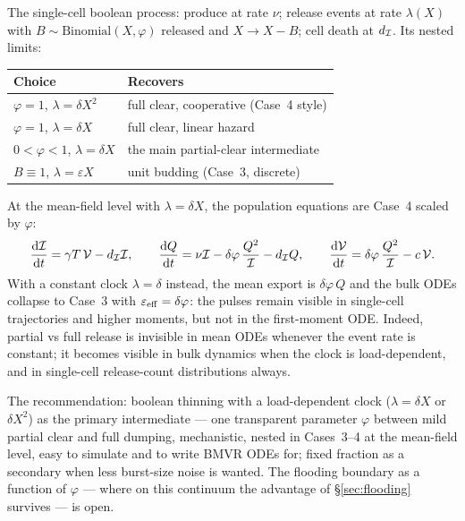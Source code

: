 The single-cell boolean process: produce at rate $\nu$; release events at
rate $\lambda(X)$ with $B\sim\mathrm{Binomial}(X,\varphi)$ released and $X\to
X-B$; cell death at $d_{\mathcal{I}}$. Its nested limits:
\begin{center}
\renewcommand{\arraystretch}{1.2}
\small
\begin{tabular}{@{}ll@{}}
\toprule
Choice & Recovers \\
\midrule
$\varphi=1$, $\lambda=\delta X^2$ & full clear, cooperative (Case~4 style) \\
$\varphi=1$, $\lambda=\delta X$ & full clear, linear hazard \\
$0<\varphi<1$, $\lambda=\delta X$ & the main partial-clear intermediate \\
$B\equiv1$, $\lambda=\varepsilon X$ & unit budding (Case~3, discrete) \\
\bottomrule
\end{tabular}
\end{center}
At the mean-field level with $\lambda=\delta X$, the population equations
are Case~4 scaled by $\varphi$:
\begin{equation}
\displaystyle\frac{{\rm d} \mathcal{I}}{{\rm d} t}=\gamma T\,\mathcal{V}-d_{\mathcal{I}}\mathcal{I},
\qquad
\displaystyle\frac{{\rm d} Q}{{\rm d} t}=\nu\mathcal{I}-\delta\varphi\,\frac{Q^2}{\mathcal{I}}-d_{\mathcal{I}}Q,
\qquad
\displaystyle\frac{{\rm d} \mathcal{V}}{{\rm d} t}=\delta\varphi\,\frac{Q^2}{\mathcal{I}}-c\,\mathcal{V}.
\end{equation}
With a constant clock $\lambda=\delta$ instead, the mean export is
$\delta\varphi\,Q$ and the bulk ODEs collapse to Case~3 with
$\varepsilon_{\rm eff}=\delta\varphi$: the pulses remain visible in single-cell
trajectories and higher moments, but not in the first-moment ODE. Indeed,
partial vs full release is invisible in mean ODEs whenever the event rate
is constant; it becomes visible in bulk dynamics when the clock is
load-dependent, and in single-cell release-count distributions always.

The recommendation: boolean thinning with a load-dependent clock
($\lambda=\delta X$ or $\delta X^2$) as the primary intermediate --- one
transparent parameter $\varphi$ between mild partial clear and full dumping,
mechanistic, nested in Cases~3--4 at the mean-field level, easy to simulate
and to write BMVR ODEs for; fixed fraction as a secondary when less
burst-size noise is wanted. The flooding boundary as a function of $\varphi$ ---
where on this continuum the advantage of \S\ref{sec:flooding} survives ---
is open.
